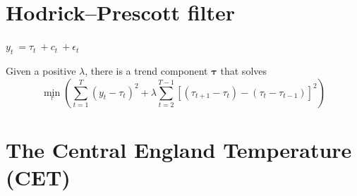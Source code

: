 \section[HP Filter]{Hodrick–Prescott filter}
\begin{slide}

  \begin{center}
    \large
    \begin{math}
      y_t\ = \tau_t\ + c_t\ + \epsilon_t
    \end{math}
  \end{center}
  Given a positive $\lambda$, there is a trend component $\mathbf{\tau}$ that solves
  \begin{displaymath}
    \min_{\tau}\left(\sum_{t = 1}^T {(y_t - \tau _t )^2 }  + \lambda \sum_{t = 2}^{T - 1} {[(\tau _{t+1}  - \tau _t) - (\tau _t  - \tau _{t - 1} )]^2 }\right)
  \end{displaymath}  
\end{slide}

\begin{slide}
  \begin{center}
  \end{center}
\end{slide}

\section[Climate 1]{The Central England Temperature (CET)}
\begin{slide}
  \begin{center}
  \end{center}
  \vspace{-1.2cm}
  
  \begin{center}
  \end{center}
\end{slide}

